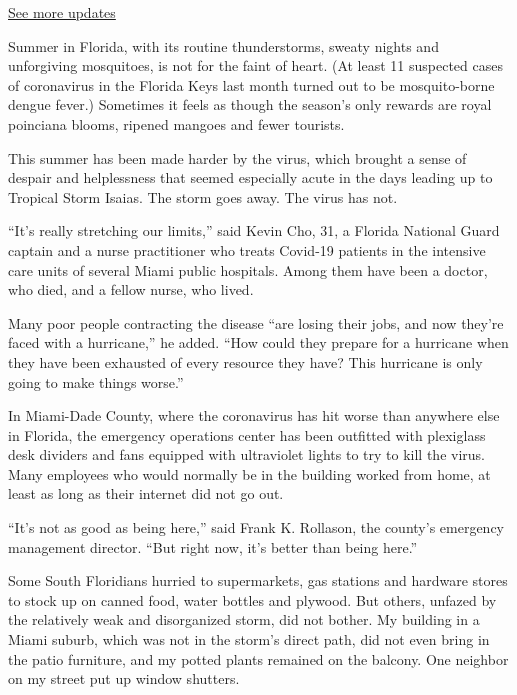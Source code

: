 \href{https://www.nytimes3xbfgragh.onion/2020/08/04/us/isaias-storm-updates.html?action=click\&pgtype=Article\&state=default\&region=MAIN_CONTENT_1\&context=storylines_live_updates}{See
more updates}

Summer in Florida, with its routine thunderstorms, sweaty nights and
unforgiving mosquitoes, is not for the faint of heart. (At least 11
suspected cases of coronavirus in the Florida Keys last month turned out
to be mosquito-borne dengue fever.) Sometimes it feels as though the
season's only rewards are royal poinciana blooms, ripened mangoes and
fewer tourists.

This summer has been made harder by the virus, which brought a sense of
despair and helplessness that seemed especially acute in the days
leading up to Tropical Storm Isaias. The storm goes away. The virus has
not.

``It's really stretching our limits,'' said Kevin Cho, 31, a Florida
National Guard captain and a nurse practitioner who treats Covid-19
patients in the intensive care units of several Miami public hospitals.
Among them have been a doctor, who died, and a fellow nurse, who lived.

Many poor people contracting the disease ``are losing their jobs, and
now they're faced with a hurricane,'' he added. ``How could they prepare
for a hurricane when they have been exhausted of every resource they
have? This hurricane is only going to make things worse.''

In Miami-Dade County, where the coronavirus has hit worse than anywhere
else in Florida, the emergency operations center has been outfitted with
plexiglass desk dividers and fans equipped with ultraviolet lights to
try to kill the virus. Many employees who would normally be in the
building worked from home, at least as long as their internet did not go
out.

``It's not as good as being here,'' said Frank K. Rollason, the county's
emergency management director. ``But right now, it's better than being
here.''

Some South Floridians hurried to supermarkets, gas stations and hardware
stores to stock up on canned food, water bottles and plywood. But
others, unfazed by the relatively weak and disorganized storm, did not
bother. My building in a Miami suburb, which was not in the storm's
direct path, did not even bring in the patio furniture, and my potted
plants remained on the balcony. One neighbor on my street put up window
shutters.

